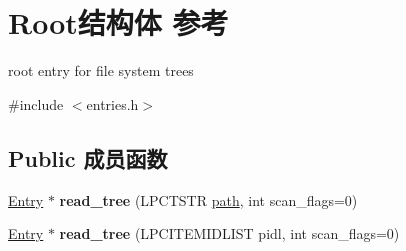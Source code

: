 \hypertarget{struct_root}{}\section{Root结构体 参考}
\label{struct_root}


root entry for file system trees  




{\ttfamily \#include $<$entries.\+h$>$}

\subsection*{Public 成员函数}
\begin{DoxyCompactItemize}
\item 
\mbox{\label{struct_root_ab1fb7329bdb12471ae98235b09e59140}} 
\hyperlink{struct_entry}{Entry} $\ast$ {\bfseries read\+\_\+tree} (L\+P\+C\+T\+S\+TR \hyperlink{structpath}{path}, int scan\+\_\+flags=0)
\item 
\mbox{\label{struct_root_a6805b8777531aeae093a49a476a43722}} 
\hyperlink{struct_entry}{Entry} $\ast$ {\bfseries read\+\_\+tree} (L\+P\+C\+I\+T\+E\+M\+I\+D\+L\+I\+ST pidl, int scan\+\_\+flags=0)
\end{DoxyCompactItemize}
